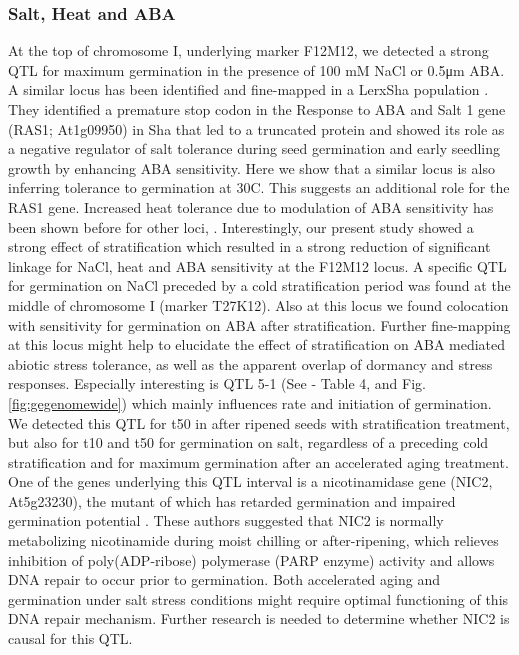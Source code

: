 \subsubsection{Salt, Heat and ABA}
At the top of chromosome I, underlying marker F12M12, we detected a strong QTL for maximum germination in 
the presence of 100 mM NaCl or 0.5μm ABA. A similar locus has been identified and fine-mapped in a 
LerxSha population \cite{Ren:2010}. They identified a premature stop codon in the Response to ABA and 
Salt 1 gene (RAS1; At1g09950) in Sha that led to a truncated protein and showed its role as a negative 
regulator of salt tolerance during seed germination and early seedling growth by enhancing ABA 
sensitivity. Here we show that a similar locus is also inferring tolerance to germination at 30\degree C. 
This suggests an additional role for the RAS1 gene. Increased heat tolerance due to modulation of 
ABA sensitivity has been shown before for other loci, \cite{Argyris:2008,Lee:2010}. 
Interestingly, our present study showed a strong effect of stratification which resulted in a strong 
reduction of significant linkage for NaCl, heat and ABA sensitivity at the F12M12 locus. A specific 
QTL for germination on NaCl preceded by a cold stratification period was found at the middle of 
chromosome I (marker T27K12). Also at this locus we found colocation with sensitivity for germination 
on ABA after stratification. Further fine-mapping at this locus might help to elucidate the effect 
of stratification on ABA mediated abiotic stress tolerance, as well as the apparent overlap of 
dormancy and stress responses. Especially interesting is QTL 5-1 (See \cite{Joosen:2011} - Table 4, and Fig. \ref{fig:gegenomewide}) which mainly 
influences rate and initiation of germination. We detected this QTL for t50 in after ripened seeds 
with stratification treatment, but also for t10 and t50 for germination on salt, regardless of a 
preceding cold stratification and for maximum germination after an accelerated aging treatment. 
One of the genes underlying this QTL interval is a nicotinamidase gene (NIC2, At5g23230), the mutant 
of which has retarded germination and impaired germination potential \cite{Hunt:2007}. These 
authors suggested that NIC2 is normally metabolizing nicotinamide during moist chilling or 
after-ripening, which relieves inhibition of poly(ADP-ribose) polymerase (PARP enzyme) activity and 
allows DNA repair to occur prior to germination. Both accelerated aging and germination under salt 
stress conditions might require optimal functioning of this DNA repair mechanism. Further research 
is needed to determine whether NIC2 is causal for this QTL.

